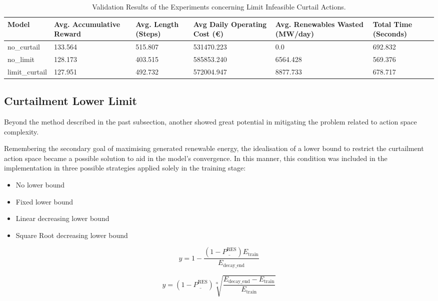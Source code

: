 \begin{table}[ht]
	\centering
	\begin{tabularx}{\textwidth}{|l|X|X|X|X|X|}
		\hline
		\textbf{Model} & \textbf{Avg. Accumulative Reward}& \textbf{Avg. Length (Steps)} & \textbf{Avg Daily Operating Cost (€)} & \textbf{Avg. Renewables Wasted (MW/day)} & \textbf{Total Time (Seconds)}\\
		\hline
		no\_curtail & 133.564 & 515.807  & 531470.223 & 0.0 & 692.832\\
		no\_limit & 128.173 & 403.515 & 585853.240 & 6564.428 & 569.376 \\
		limit\_curtail & 127.951 &  492.732 & 572004.947 & 8877.733 & 678.717 \\
		\hline
	\end{tabularx}
	\caption{Validation Results of the Experiments concerning Limit Infeasible Curtail Actions.}
	\label{fig:exp-val-obs}
\end{table}

\subsection{Curtailment Lower Limit} \label{sec:curtailment-lower-limit}

Beyond the method described in the past subsection, another showed great potential in mitigating the problem related to action space complexity. \par
Remembering the secondary goal of maximising generated renewable energy, the idealisation of a lower bound to restrict the curtailment action space became a possible solution to aid in the model's convergence. In this manner, this condition was included in the implementation in three possible strategies applied solely in the training stage:

\begin{itemize}
	\item No lower bound
	\item Fixed lower bound
	\item Linear decreasing lower bound
	\item Square Root decreasing lower bound
\end{itemize}


\begin{equation}
	y = 1 - \frac{(1 - \underline{P^\text{RES}}) E_\text{train}}{E_\text{decay\_end}}
\end{equation}

\begin{equation}
	y = (1 - \underline{P^\text{RES}}) \sqrt[\alpha]{\frac{E_\text{decay\_end} - E_\text{train}}{E_\text{train}}}
\end{equation}


